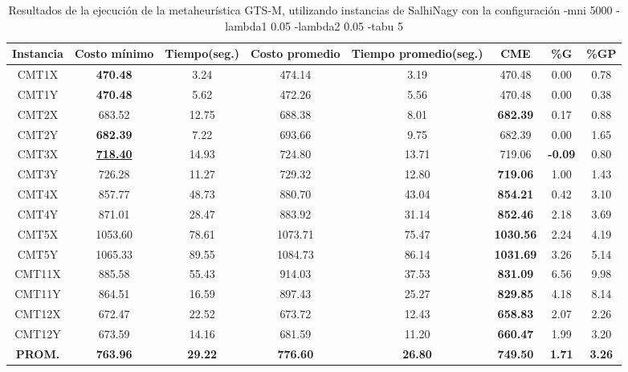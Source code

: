 \begin{table}[h]
\caption{Resultados de la ejecución de la metaheurística GTS-M, utilizando instancias de SalhiNagy con la configuración -mni 5000 -lambda1 0.05 -lambda2 0.05 -tabu 5}
\centering
\small
\begin{tabular}{c c c c c c c c}
\hline\hline
Instancia & Costo mínimo & Tiempo(seg.) & Costo promedio & Tiempo promedio(seg.) & CME & \%G & \%GP \\ [0.5ex]
\hline
CMT1X & \bf{470.48} & 3.24 & 
474.14 & 3.19 & 470.48 & 0.00
 & 0.78\\CMT1Y & \bf{470.48} & 5.62 & 
472.26 & 5.56 & 470.48 & 0.00
 & 0.38\\CMT2X & 683.52 & 12.75 & 
688.38 & 8.01 & \bf{682.39} & 
0.17 & 0.88\\CMT2Y & \bf{682.39} & 7.22 & 
693.66 & 9.75 & 682.39 & 0.00
 & 1.65\\CMT3X & \bf{\underline{718.40}} & 14.93 & 
724.80 & 13.71 & 719.06 & 
\bf{-0.09} & 0.80\\CMT3Y & 726.28 & 11.27 & 
729.32 & 12.80 & \bf{719.06} & 
1.00 & 1.43\\CMT4X & 857.77 & 48.73 & 
880.70 & 43.04 & \bf{854.21} & 
0.42 & 3.10\\CMT4Y & 871.01 & 28.47 & 
883.92 & 31.14 & \bf{852.46} & 
2.18 & 3.69\\CMT5X & 1053.60 & 78.61 & 
1073.71 & 75.47 & \bf{1030.56} & 
2.24 & 4.19\\CMT5Y & 1065.33 & 89.55 & 
1084.73 & 86.14 & \bf{1031.69} & 
3.26 & 5.14\\CMT11X & 885.58 & 55.43 & 
914.03 & 37.53 & \bf{831.09} & 
6.56 & 9.98\\CMT11Y & 864.51 & 16.59 & 
897.43 & 25.27 & \bf{829.85} & 
4.18 & 8.14\\CMT12X & 672.47 & 22.52 & 
673.72 & 12.43 & \bf{658.83} & 
2.07 & 2.26\\CMT12Y & 673.59 & 14.16 & 
681.59 & 11.20 & \bf{660.47} & 
1.99 & 3.20\\\bf{PROM.} & 
\bf{763.96} & \bf{29.22} & \bf{776.60} & \bf{26.80} & \bf{749.50} & \bf{1.71} & \bf{3.26}\\[1ex]\hline
\end{tabular}
\label{table:nonlin}
\end{table}

